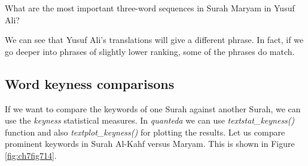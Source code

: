 \documentclass[
]{article}
\newenvironment{Shaded}{\begin{snugshade}}{\end{snugshade}}
\newcommand{\AttributeTok}[1]{\textcolor[rgb]{0.13,0.29,0.53}{#1}}
\newcommand{\ConstantTok}[1]{\textcolor[rgb]{0.56,0.35,0.01}{#1}}
\newcommand{\DecValTok}[1]{\textcolor[rgb]{0.00,0.00,0.81}{#1}}
\newcommand{\FloatTok}[1]{\textcolor[rgb]{0.00,0.00,0.81}{#1}}
\newcommand{\FunctionTok}[1]{\textcolor[rgb]{0.13,0.29,0.53}{\textbf{#1}}}
\newcommand{\NormalTok}[1]{#1}
\newcommand{\OtherTok}[1]{\textcolor[rgb]{0.56,0.35,0.01}{#1}}
\newcommand{\SpecialCharTok}[1]{\textcolor[rgb]{0.81,0.36,0.00}{\textbf{#1}}}
\newcommand{\StringTok}[1]{\textcolor[rgb]{0.31,0.60,0.02}{#1}}
\begin{document}
\normalsize

What are the most important three-word sequences in Surah Maryam in Yusuf Ali?

\footnotesize

\begin{Shaded}
\end{Shaded}

\normalsize

We can see that Yusuf Ali's translations will give a different phrase. In fact, if we go deeper into phrases of slightly lower ranking, some of the phrases do match.

\hypertarget{word-keyness-comparisons}{%
\subsection{Word keyness comparisons}\label{word-keyness-comparisons}}

If we want to compare the keywords of one Surah against another Surah, we can use the \emph{keyness} statistical measures. In \emph{quanteda} we can use \emph{textstat\_keyness()} function and also \emph{textplot\_keyness()} for plotting the results. Let us compare prominent keywords in Surah Al-Kahf versus Maryam. This is shown in Figure \ref{fig:ch7fig714}.
\end{document}
